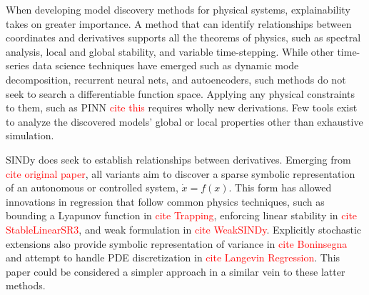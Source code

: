 \documentclass{article}
\newcommand{\red}[1]{\textcolor{red}{#1}}
\begin{document}

When developing model discovery methods for physical systems, explainability takes on greater importance.
A method that can identify relationships between coordinates and derivatives supports all the theorems of physics, such as spectral analysis, local and global stability, and variable time-stepping.
While other time-series data science techniques have emerged such as dynamic mode decomposition, recurrent neural nets, and autoencoders, such methods do not seek to search a differentiable function space.
Applying any physical constraints to them, such as PINN \red{cite this} requires wholly new derivations.
Few tools exist to analyze the discovered models' global or local properties other than exhaustive simulation.

SINDy does seek to establish relationships between derivatives.
Emerging from \red{cite original paper}, all variants aim to discover a sparse symbolic representation of an autonomous or controlled system, $\dot x = f(x)$.
This form has allowed innovations in regression that follow common physics techniques, such as bounding a Lyapunov function in \red{cite Trapping}, enforcing linear stability in \red{cite StableLinearSR3}, and weak formulation in \red{cite WeakSINDy}.
Explicitly stochastic extensions also provide symbolic representation of variance in \red{cite Boninsegna} and attempt to handle PDE discretization in \red{cite Langevin Regression}.
This paper could be considered a simpler approach in a similar vein to these latter methods.
\end{document}
